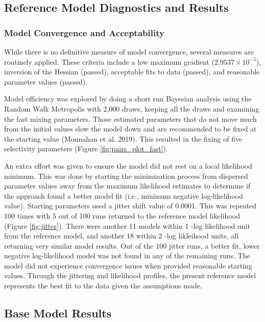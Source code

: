 \documentclass[11pt,
  letterpaper,
]{article}
\begin{document}
\hypertarget{reference-model-diagnostics-and-results}{%
\subsection{Reference Model Diagnostics and Results}\label{reference-model-diagnostics-and-results}}

\hypertarget{model-convergence}{%
\subsubsection{Model Convergence and Acceptability}\label{model-convergence}}

While there is no definitive measure of model convergence, several measures are routinely applied. These criteria include a low maximum gradient (\ensuremath{2.9537\times 10^{-5}}), inversion of the Hessian (passed), acceptable fits to data (passed), and reasonable parameter values (passed).

Model efficiency was explored by doing a short run Bayesian analysis using the Random Walk Metropolis with 2,000 draws, keeping all the draws and examining the fast mixing parameters. Those estimated parameters that do not move much from the initial values slow the model down and are recommended to be fixed at the starting value (Monnahan et al. 2019). This resulted in the fixing of five selectivity parameters (Figure \ref{fig:pairs_plot_fast}).

An extra effort was given to ensure the model did not rest on a local likelihood minimum. This was done by starting the minimization process from dispersed parameter values away from the maximum likelihood estimates to determine if the approach found a better model fit (i.e., minimum negative log-likelihood value). Starting parameters used a jitter shift value of 0.0001. This was repeated 100 times with 5 out of 100 runs returned to the reference model likelihood (Figure \ref{fig:jitter}). There were another 11 models within 1 -log likelihood unit from the reference model, and another 18 within 2 -log likleihood units, all returning very similar model results. Out of the 100 jitter runs, a better fit, lower negative log-likelihood model was not found in any of the remaining runs. The model did not experience convergence issues when provided reasonable starting values. Through the jittering and likelihood profiles, the present reference model represents the best fit to the data given the assumptions made.

\hypertarget{base-model-results}{%
\subsection{Base Model Results}\label{base-model-results}}
\end{document}
